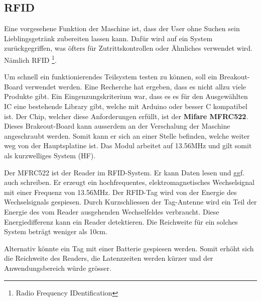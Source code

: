 \subsection{RFID}
\label{subsec:RFID}

Eine vorgesehene Funktion der Maschine ist, dass der User ohne Suchen sein Lieblingsgetränk zubereiten lassen kann. Dafür wird auf ein System zurückgegriffen, was öfters für Zutrittskontrollen oder Ähnliches verwendet wird. Nämlich RFID \footnote{Radio Frequency IDentification}.

Um schnell ein funktionierendes Teilsystem testen zu können, soll ein Breakout-Board verwendet werden. Eine Recherche hat ergeben, dass es nicht allzu viele Produkte gibt. Ein Eingenzungskriterium war, dass es es für den Ausgewählten IC eine bestehende Library gibt, welche mit Arduino oder besser C kompatibel ist. Der Chip, welcher diese Anforderungen erfüllt, ist der \textbf{Mifare MFRC522}. Dieses Brakeout-Board kann ausserdem an der Verschalung der Maschine angeschraubt werden. Somit kann er sich an einer Stelle befinden, welche weiter weg von der Hauptsplatine ist.
Das Modul arbeitet auf 13.56MHz und gilt somit als kurzwelliges System (HF).

Der MFRC522 ist der Reader im RFID-System. Er kann Daten lesen und ggf. auch schreiben. Er erzeugt ein hochfrequentes, elektromagnetisches Wechselsignal mit einer Frequenz von 13.56MHz. Der RFID-Tag wird von der Energie des Wechselsignals gespiesen. Durch Kurzschliessen der Tag-Antenne wird ein Teil der Energie des vom Reader ausgehenden Wechselfeldes verbraucht. Diese Energiedifferenz kann ein Reader detektieren. Die Reichweite für ein solches System beträgt weniger als 10cm.

Alternativ könnte ein Tag mit einer Batterie gespiesen werden. Somit erhöht sich die Reichweite des Readers, die Latenzzeiten werden kürzer und der Anwendungsbereich würde grösser.



